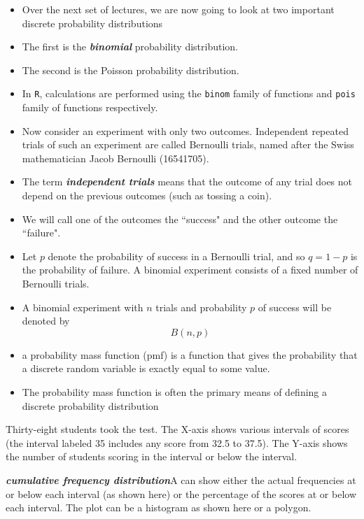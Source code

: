 \documentclass[12pt]{report}
\begin{document}
{ \Large
	
	\begin{itemize}
		
		\item Over the next set of lectures, we are now going to look at two important discrete probability distributions
		
		\item The first is the \textbf{\emph{binomial}} probability distribution.
		
		\item The second is the Poisson probability distribution.
		
		\item In \texttt{R}, calculations are performed using the \texttt{binom} family of functions and \texttt{pois} family of functions respectively.
		
		\item Now consider an experiment with only two outcomes. Independent repeated trials of such an experiment are
		called Bernoulli trials, named after the Swiss mathematician Jacob Bernoulli (16541705). \item The term \textbf{\emph{independent
				trials}} means that the outcome of any trial does not depend on the previous outcomes (such as tossing a coin).
		\item We will call one of the outcomes the ``success" and the other outcome the ``failure".
		
		\item
		Let $p$ denote the probability of success in a Bernoulli trial, and so $q = 1 - p$ is the probability of failure.
		A binomial experiment consists of a fixed number of Bernoulli trials. \item A binomial experiment with $n$ trials and
		probability $p$ of success will be denoted by
		\[B(n, p)\]
		\item a probability mass function (pmf) is a function that gives the probability that a 
		discrete random variable is exactly equal to some value. 
		\item The probability mass function is often the primary means of defining a discrete probability distribution 
	\end{itemize}
}
{ \Large
	Thirty-eight students took the test. The X-axis shows various intervals of scores (the interval labeled 35 includes any score from 32.5 to 37.5). The Y-axis shows the number of students scoring in the interval or below the interval.
	
	\textbf{\emph{cumulative frequency distribution}}A  can show either the actual frequencies at or below each interval (as shown here) or the percentage of the scores at or below each interval. The plot can be a histogram as shown here or a polygon.
}
\end{document}
